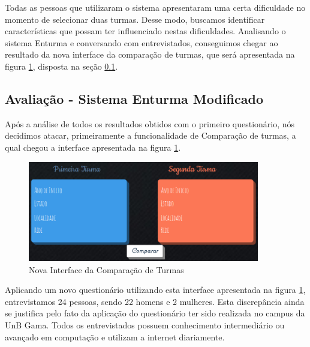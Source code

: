 Todas as pessoas que utilizaram o sistema apresentaram uma certa dificuldade no momento de selecionar duas turmas. Desse modo, buscamos identificar características que possam ter influenciado nestas dificuldades. Analisando o sistema Enturma e conversando com entrevistados, conseguimos chegar ao resultado da nova interface da comparação de turmas, que será apresentada na figura \ref{img:novaComparacao}, disposta na seção \ref{sub:avalia_o_sistema_enturma_}.


\subsection{Avaliação - Sistema Enturma Modificado} %
\label{sub:avalia_o_sistema_enturma_}

Após a análise de todos os resultados obtidos com o primeiro questionário, nós decidimos atacar, primeiramente a funcionalidade de Comparação de turmas, a qual chegou a interface apresentada na figura \ref{img:novaComparacao}.

\begin{figure}[H]
	\centering
	\includegraphics[width=0.9\textwidth]{imagens/novoComparar}
	\caption{Nova Interface da Comparação de Turmas}
	\label{img:novaComparacao}
\end{figure}

Aplicando um novo questionário utilizando esta interface apresentada na figura \ref{img:novaComparacao}, entrevistamos 24 pessoas, sendo 22 homens e 2 mulheres. Esta discrepância ainda se justifica pelo fato da aplicação do questionário ter sido realizada no campus da UnB Gama. Todos os entrevistados possuem conhecimento intermediário ou avançado em computação e utilizam a internet diariamente. 


